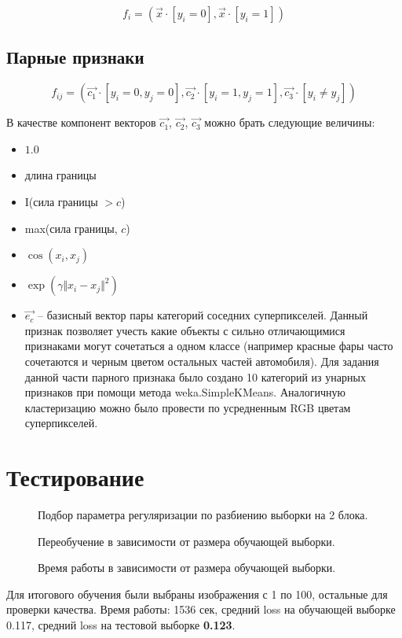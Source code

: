 \documentclass[russian,10pt,a4paper]{article}
\newcommand{\imgh}[3]{\begin{figure}[!h]\center{\texttt{[image: \#2]}}\caption{#3}\label{Fig:#2}\end{figure}}
\theoremstyle{definition}
\begin{document}
\[
f_i = ( \vec{x} \cdot [y_i = 0] , \vec{x} \cdot [y_i = 1] ) 
\] 

\subsection*{Парные признаки}

\[
f_{ij} = ( \vec{c_1} \cdot [y_i = 0, y_j = 0] , \vec{c_2} \cdot [y_i = 1, y_j = 1],  \vec{c_3} \cdot [y_i \neq y_j]) 
\] 

В качестве компонент векторов $\vec{c_1}$, $\vec{c_2}$, $\vec{c_3}$ можно брать следующие величины:

\begin{itemize}
\item $1.0$
\item длина границы
\item I(сила границы $> c$) 
\item max(сила границы, $c$) 
\item $\cos(x_i, x_j)$
\item $\exp(\gamma \Vert x_i -  x_j \Vert^2)$
\item $\vec{e_c}$ --  базисный вектор пары категорий соседних суперпикселей. Данный признак позволяет учесть какие объекты с сильно отличающимися признаками могут сочетаться а одном классе (например красные фары часто сочетаются и черным цветом остальных частей автомобиля). Для задания данной части парного признака было создано 10 категорий из унарных признаков при помощи метода weka.SimpleKMeans. Аналогичную кластеризацию можно было провести по усредненным RGB   цветам суперпикселей. 
\end{itemize} 

\section{Тестирование}


\imgh{80mm}{C}{Подбор параметра регуляризации по разбиению выборки на 2 блока.}

\imgh{80mm}{size}{Переобучение в зависимости от размера обучающей выборки.}

\imgh{80mm}{time}{Время работы в зависимости от размера обучающей выборки.}

Для итогового обучения были выбраны изображения с 1 по 100, остальные для проверки качества. Время работы: 1536 сек, средний loss на обучающей выборке 
0.117, средний  loss на тестовой выборке\textbf{ 0.123}.  
\end{document}
